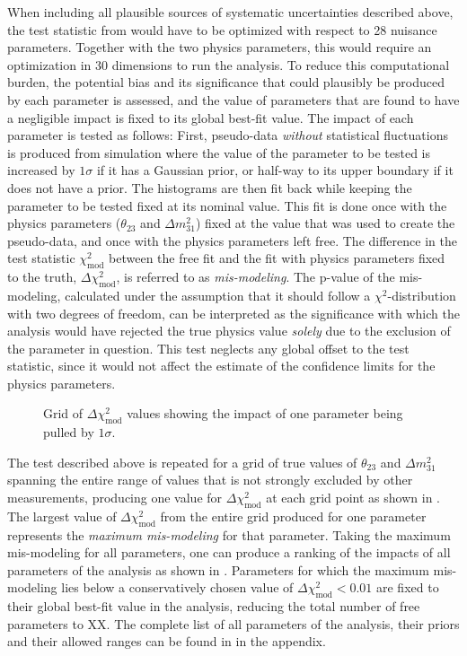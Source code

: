 When including all plausible sources of systematic uncertainties described above, the test statistic from  would have to be optimized with respect to 28 nuisance parameters. Together with the two physics parameters, this would require an optimization in 30 dimensions to run the analysis. To reduce this computational burden, the potential bias and its significance that could plausibly be produced by each parameter is assessed, and the value of parameters that are found to have a negligible impact is fixed to its global best-fit value. The impact of each parameter is tested as follows: First, pseudo-data \emph{without} statistical fluctuations is produced from simulation where the value of the parameter to be tested is increased by $1\sigma$ if it has a Gaussian prior, or half-way to its upper boundary if it does not have a prior. The histograms are then fit back while keeping the parameter to be tested fixed at its nominal value. This fit is done once with the physics parameters ($\theta_{23}$ and $\Delta m^2_{31}$) fixed at the value that was used to create the pseudo-data, and once with the physics parameters left free. The difference in the test statistic $\chi^2_{\mathrm{mod}}$ between the free fit and the fit with physics parameters fixed to the truth, $\Delta \chi^2_{\mathrm{mod}}$, is referred to as \emph{mis-modeling}. The p-value of the mis-modeling, calculated under the assumption that it should follow a $\chi^2$-distribution with two degrees of freedom, can be interpreted as the significance with which the analysis would have rejected the true physics value \emph{solely} due to the exclusion of the parameter in question. This test neglects any global offset to the test statistic, since it would not affect the estimate of the confidence limits for the physics parameters.
\begin{figure}
    \centering
    \caption{Grid of $\Delta \chi^2_{\mathrm{mod}}$ values showing the impact of one parameter being pulled by $1\sigma$.}
    \label{fig:systematic-impact-mismod-example}
\end{figure}
The test described above is repeated for a grid of true values of $\theta_{23}$ and $\Delta m^2_{31}$ spanning the entire range of values that is not strongly excluded by other measurements, producing one value for $\Delta \chi^2_{\mathrm{mod}}$ at each grid point as shown in . The largest value of $\Delta \chi^2_{\mathrm{mod}}$ from the entire grid produced for one parameter represents the \emph{maximum mis-modeling} for that parameter. Taking the maximum mis-modeling for all parameters, one can produce a ranking of the impacts of all parameters of the analysis as shown in . Parameters for which the maximum mis-modeling lies below a conservatively chosen value of $\Delta \chi^2_{\mathrm{mod}} < 0.01$ are fixed to their global best-fit value in the analysis, reducing the total number of free parameters to XX. The complete list of all parameters of the analysis, their priors and their allowed ranges can be found in  in the appendix.
